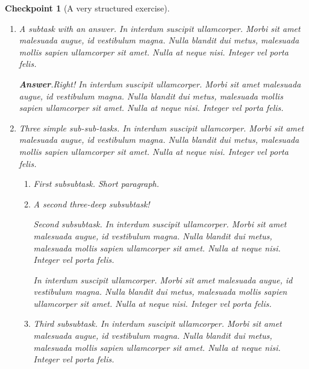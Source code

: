 \documentclass[pdflatex]{sn-jnl}
\theoremstyle{thmstyleone}%
\theoremstyle{thmstyletwo}%
\newtheorem{inlineexercise}[theorem]{Checkpoint}
\theoremstyle{thmstylethree}%
\newcommand{\blocktitlefont}{\relax}
\newcommand{\lititle}[1]{{\slshape#1}}
\numberwithin{equation}{section}
\begin{document}
\begin{inlineexercise}[A very structured exercise]
\begin{enumerate}[font=\bfseries,label=(\alph*),ref=\alph*]
\begin{enumerate}[font=\bfseries,label=(\roman*),ref=\theenumi.\roman*]
A really simple subtask.  In interdum suscipit ullamcorper. Morbi sit amet malesuada augue, id vestibulum magna. Nulla blandit dui metus, malesuada mollis sapien ullamcorper sit amet. Nulla at neque nisi. Integer vel porta felis.%
\par
A short paragraph, before an answer.%
\par\smallskip%
\noindent\textbf{\blocktitlefont Answer}.\hypertarget{exercise-structured-5-3-3}{}\quad{}With a proof.%
\begin{proof}\label{exercise-structured-5-3-3-2}%
In interdum suscipit ullamcorper. Morbi sit amet malesuada augue, id vestibulum magna. Nulla blandit dui metus, malesuada mollis sapien ullamcorper sit amet. Nulla at neque nisi. Integer vel porta felis.%
\end{proof}
And a bit more to say.%
\item{}A subtask with an answer.  In interdum suscipit ullamcorper. Morbi sit amet malesuada augue, id vestibulum magna. Nulla blandit dui metus, malesuada mollis sapien ullamcorper sit amet. Nulla at neque nisi. Integer vel porta felis.%
\par\smallskip%
\noindent\textbf{\blocktitlefont Answer}.\hypertarget{exercise-structured-5-4-2}{}\quad{}Right!  In interdum suscipit ullamcorper. Morbi sit amet malesuada augue, id vestibulum magna. Nulla blandit dui metus, malesuada mollis sapien ullamcorper sit amet. Nulla at neque nisi. Integer vel porta felis.%
\item{}Three simple sub-sub-tasks.  In interdum suscipit ullamcorper. Morbi sit amet malesuada augue, id vestibulum magna. Nulla blandit dui metus, malesuada mollis sapien ullamcorper sit amet. Nulla at neque nisi. Integer vel porta felis.%
\begin{enumerate}[font=\bfseries,label=(\Alph*),ref=\theenumi.\theenumii.\Alph*]%
\item{}First subsubtask.  Short paragraph.%
\item{}\lititle{A second three-deep subsubtask!}\par%
Second subsubtask.  In interdum suscipit ullamcorper. Morbi sit amet malesuada augue, id vestibulum magna. Nulla blandit dui metus, malesuada mollis sapien ullamcorper sit amet. Nulla at neque nisi. Integer vel porta felis.%
\par
In interdum suscipit ullamcorper. Morbi sit amet malesuada augue, id vestibulum magna. Nulla blandit dui metus, malesuada mollis sapien ullamcorper sit amet. Nulla at neque nisi. Integer vel porta felis.%
\item{}Third subsubtask.  In interdum suscipit ullamcorper. Morbi sit amet malesuada augue, id vestibulum magna. Nulla blandit dui metus, malesuada mollis sapien ullamcorper sit amet. Nulla at neque nisi. Integer vel porta felis.%

\end{enumerate}
\end{enumerate}
\end{enumerate}
\end{inlineexercise}
\end{document}
